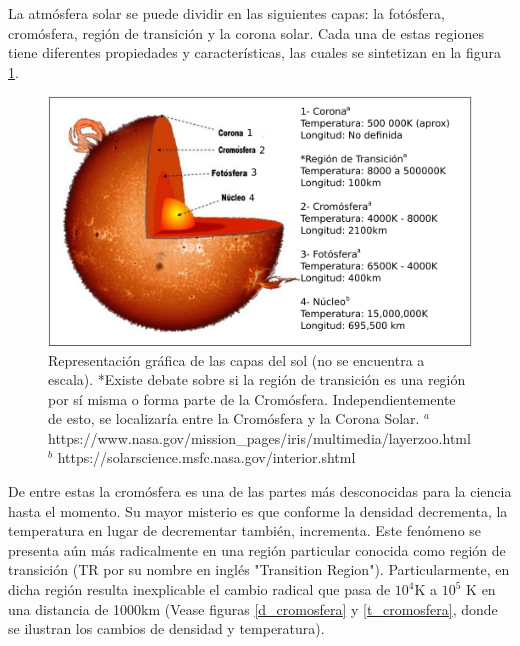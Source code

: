 \documentclass[9pt]{book}
\begin{document}
La atm\'osfera solar se puede dividir en las siguientes capas: la fot\'osfera, crom\'osfera, regi\'on de transici\'on y la corona solar. Cada una de estas regiones tiene diferentes propiedades y caracter\'isticas, las cuales se sintetizan en la figura \ref{atmosfera_solar}.

\begin{figure}[h]
\centering
\includegraphics[scale=.5]{atmosfera}
\caption{ Representaci\'on gr\'afica de las capas del sol (no se encuentra a escala). \newline
*Existe debate sobre si la regi\'on de transici\'on es una regi\'on por s\'i misma o forma parte de la Crom\'osfera. Independientemente de esto, se localizar\'ia entre la Crom\'osfera y la Corona Solar. \newline
$^{a}$ https://www.nasa.gov/mission\_pages/iris/multimedia/layerzoo.html \newline
$^{b}$ https://solarscience.msfc.nasa.gov/interior.shtml}
\label{atmosfera_solar}
\end{figure}



De entre estas la crom\'osfera es una de las partes m\'as desconocidas para la ciencia hasta el momento. Su mayor misterio es que conforme la densidad decrementa, la temperatura en lugar de decrementar tambi\'en, incrementa. Este fen\'omeno se presenta a\'un m\'as radicalmente en una regi\'on particular conocida como regi\'on de transici\'on (TR por su nombre en ingl\'es "Transition Region"). Particularmente, en dicha regi\'on resulta inexplicable el cambio radical que pasa de $10^4$K a $10^5$ K en una distancia de 1000km (Vease figuras \ref{d_cromosfera} y \ref{t_cromosfera}, donde se ilustran los cambios de densidad y temperatura).
\end{document}
